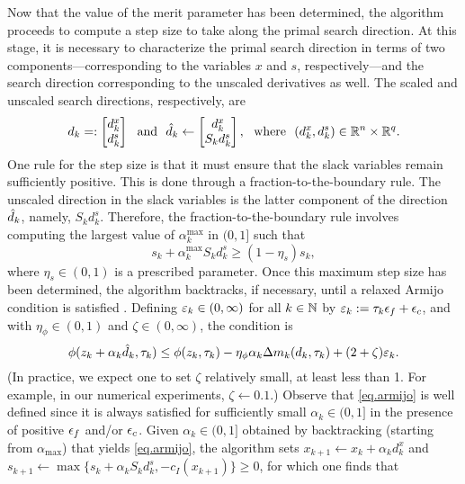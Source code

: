 Now that the value of the merit parameter has been determined, the algorithm proceeds to compute a step size to take along the primal search direction.  At this stage, it is necessary to characterize the primal search direction in terms of two components---corresponding to the variables $x$ and $s$, respectively---and the search direction corresponding to the unscaled derivatives as well.  The scaled and unscaled search directions, respectively, are
\begin{equation*}
  d_k =: \begin{bmatrix} d_k^x \\ d_k^s \end{bmatrix}\ \ \text{and}\ \ \dhat_k \gets \begin{bmatrix} d_k^x \\ S_k d_k^s \end{bmatrix},\ \ \text{where}\ \ (d_k^x,d_k^s) \in \RR^n \times \RR^q.
\end{equation*}
One rule for the step size is that it must ensure that the slack variables remain sufficiently positive.  This is done through a fraction-to-the-boundary rule.  The unscaled direction in the slack variables is the latter component of the direction~${\hat d}_k$, namely, $S_k d_k^s$.  Therefore, the fraction-to-the-boundary rule involves computing the largest value of $\alpha_k^{\max}$ in $(0,1]$ such that
\begin{equation}\label{eq.foc}
  s_k + \alpha_k^{\max} S_k d_k^s \geq (1 - \eta_s) s_k,
\end{equation}
where $\eta_s \in (0, 1)$ is a prescribed parameter.  Once this maximum step size has been determined, the algorithm backtracks, if necessary, until a relaxed Armijo condition is satisfied 
\cite{berahas2019derivative,oztoprak2023constrained}.  
Defining $\varepsilon_k \in (0,\infty)$ for all $k \in \mathbb{N}$ by $\varepsilon_k := \tau_k \epsilon_f + \epsilon_c$, and with $\eta_\phi \in (0,1)$ and $\zeta \in (0,\infty)$, the condition is
\begin{equation}\label{eq.armijo}
  \phi(z_k + \alpha_k  {\hat d}_k, \tau_k) \leq \phi(z_k, \tau_k) - \eta_\phi \alpha_k \Delta m_k (d_k, \tau_k) + (2 + \zeta) \varepsilon_k.
\end{equation}
(In practice, we expect one to set $\zeta$ relatively small, at least less than 1.  For example, in our numerical experiments, $\zeta \gets 0.1$.) Observe that \eqref{eq.armijo} is well defined since it is always satisfied for sufficiently small $\alpha_k \in (0,1]$ in the presence of positive $\epsilon_f$ and/or $\epsilon_c$.  Given $\alpha_k \in (0,1]$ obtained by backtracking (starting from $\alpha_{\max}$) that yields \eqref{eq.armijo}, the algorithm sets $x_{k+1} \gets x_k + \alpha_k d_k^x$ and $s_{k+1} \gets \max\{s_k + \alpha_k S_k d_k^s, -c_I(x_{k+1})\} \geq 0$, for which one finds that 
